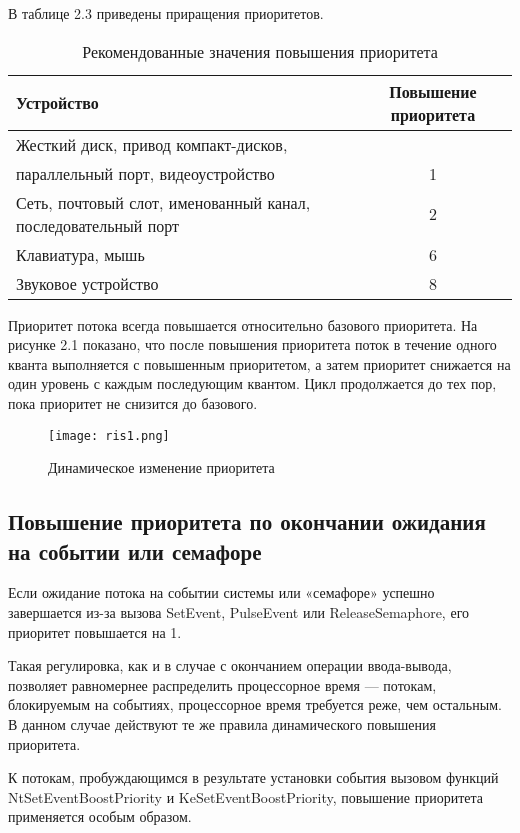 \documentclass[12pt]{report}
\begin{document}
В таблице 2.3 приведены приращения приоритетов.

\begin{table}[H]
	\centering
	\begin{tabular}{|l| c |} 
		\hline
		Устройство & Повышение приоритета\\ [0.5ex] 
		\hline\hline
		Жесткий диск, привод компакт-дисков,\\ параллельный порт, видеоустройство & 1 \\
		\hline
		Сеть, почтовый слот, именованный канал, последовательный порт & 2 \\
		\hline
		Клавиатура, мышь & 6\\
		\hline
		Звуковое устройство & 8\\
		\hline
	\end{tabular}
	\caption{Рекомендованные значения повышения приоритета}
\end{table}
	
Приоритет потока всегда повышается относительно базового приоритета. На рисунке 2.1 показано, что после повышения приоритета поток в течение одного кванта выполняется с повышенным приоритетом, а затем приоритет снижается на один уровень с каждым последующим квантом. Цикл продолжается до тех пор, пока приоритет не снизится до базового.

\begin{figure}[h]
	\centering
	{\texttt{[image: ris1.png]}} 
	\caption{Динамическое изменение приоритета}
	\label{ris1}
\end{figure}

\subsection{Повышение приоритета по окончании ожидания на событии или семафоре}
Если ожидание потока на событии системы или «семафоре» успешно завершается из-за вызова SetEvent, PulseEvent или ReleaseSemaphore, его приоритет повышается на 1.

Такая регулировка, как и в случае с окончанием операции ввода-вывода, позволяет равномернее распределить процессорное время
—	потокам, блокируемым на событиях, процессорное время требуется реже, чем остальным. В данном случае действуют те же правила динамического повышения приоритета.

К потокам, пробуждающимся в результате установки события вызовом функций NtSetEventBoostPriority и KeSetEventBoostPriority, повышение приоритета применяется особым образом.
\end{document}
